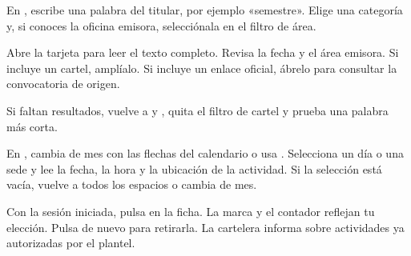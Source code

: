 \begin{pasos}
\item En , escribe una palabra del titular, por ejemplo «semestre». Elige una categoría y, si conoces la oficina emisora, selecciónala en el filtro de área.
\item Abre la tarjeta para leer el texto completo. Revisa la fecha y el área emisora. Si incluye un cartel, amplíalo. Si incluye un enlace oficial, ábrelo para consultar la convocatoria de origen.
\item Si faltan resultados, vuelve a  y , quita el filtro de cartel y prueba una palabra más corta.
\end{pasos}
En , cambia de mes con las flechas del calendario o usa . Selecciona un día o una sede y lee la fecha, la hora y la ubicación de la actividad. Si la selección está vacía, vuelve a todos los espacios o cambia de mes.
\par Con la sesión iniciada, pulsa  en la ficha. La marca y el contador reflejan tu elección. Pulsa de nuevo para retirarla. La cartelera informa sobre actividades ya autorizadas por el plantel.

